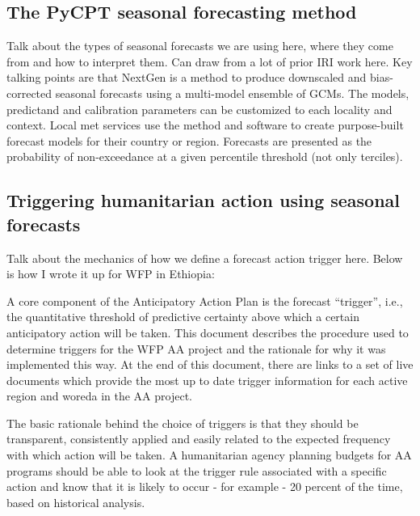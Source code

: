\documentclass{ametsocV5}
\begin{document}
\subsection{The PyCPT seasonal forecasting method}


Talk about the types of seasonal forecasts we are using here, where they come from and how to interpret them. Can draw from a lot of prior IRI work here. Key talking points are that NextGen is a method to produce downscaled and bias-corrected seasonal forecasts using a multi-model ensemble of GCMs. The models, predictand and calibration parameters can be customized to each locality and context. Local met services use the method and software to create purpose-built forecast models for their country or region. Forecasts are presented as the probability of non-exceedance at a given percentile threshold (not only terciles).

\subsection{Triggering humanitarian action using seasonal forecasts}


Talk about the mechanics of how we define a forecast action trigger here. Below is how I wrote it up for WFP in Ethiopia: 

A core component of the Anticipatory Action Plan is the forecast “trigger”, i.e., the quantitative threshold of predictive certainty above which a certain anticipatory action will be taken. 
This document describes the procedure used to determine triggers for the WFP AA project and the rationale for why it was implemented this way. At the end of this document, there are links to a set of live documents which provide the most up to date trigger information for each active region and woreda in the AA project.

The basic rationale behind the choice of triggers is that they should be transparent, consistently applied and easily related to the expected frequency with which action will be taken. A humanitarian agency planning budgets for AA programs should be able to look at the trigger rule associated with a specific action and know that it is likely to occur - for example - 20 percent  of the time, based on historical analysis. 
\end{document}
